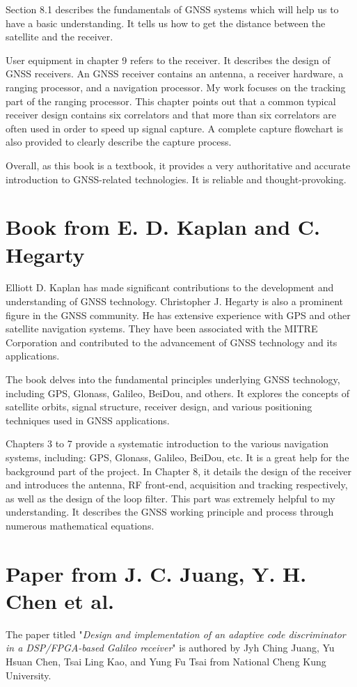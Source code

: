 Section 8.1 describes the fundamentals of GNSS systems which will help us to have a basic understanding. It tells us how to get the distance between the satellite and the receiver.

User equipment in chapter 9 refers to the receiver. It describes the design of GNSS receivers. An GNSS receiver contains an antenna, a receiver hardware, a ranging processor, and a navigation processor. My work focuses on the tracking part of the ranging processor. This chapter points out that a common typical receiver design contains six correlators and that more than six correlators are often used in order to speed up signal capture. A complete capture flowchart is also provided to clearly describe the capture process.

Overall, as this book is a textbook, it provides a very authoritative and accurate introduction to GNSS-related technologies. It is reliable and thought-provoking.

\section{Book from E. D. Kaplan and C. Hegarty\texorpdfstring{\cite{RN177}}{}}
Elliott D. Kaplan has made significant contributions to the development and understanding of GNSS technology. Christopher J. Hegarty is also a prominent figure in the GNSS community. He has extensive experience with GPS and other satellite navigation systems. They have been associated with the MITRE Corporation and contributed to the advancement of GNSS technology and its applications.

The book delves into the fundamental principles underlying GNSS technology, including GPS, Glonass, Galileo, BeiDou, and others. It explores the concepts of satellite orbits, signal structure, receiver design, and various positioning techniques used in GNSS applications.

Chapters 3 to 7 provide a systematic introduction to the various navigation systems, including: GPS, Glonass, Galileo, BeiDou, etc. It is a great help for the background part of the project. In Chapter 8, it details the design of the receiver and introduces the antenna, RF front-end, acquisition and tracking respectively, as well as the design of the loop filter. This part was extremely helpful to my understanding. It describes the GNSS working principle and process through numerous mathematical equations.

\section{Paper from J. C. Juang, Y. H. Chen et al.\texorpdfstring{\cite{RN147}}{}}
The paper titled "\textit{Design and implementation of an adaptive code discriminator in a DSP/FPGA-based Galileo receiver}" is authored by Jyh Ching Juang, Yu Hsuan Chen, Tsai Ling Kao, and Yung Fu Tsai from National Cheng Kung University.

